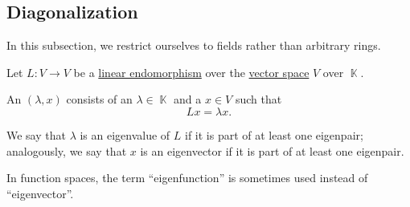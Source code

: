 \subsection{Diagonalization}\label{subsec:diagonalization}

In this subsection, we restrict ourselves to fields rather than arbitrary rings.

\begin{definition}\label{def:eigenpair}
  Let \( L: V \to V \) be a \hyperref[def:semimodule/homomorphism]{linear endomorphism} over the \hyperref[def:vector_space]{vector space} \( V \) over \( \BbbK \).

  An  \( (\lambda, x) \) consists of an  \( \lambda \in \BbbK \) and a   \( x \in V \) such that
  \begin{equation*}
    Lx = \lambda x.
  \end{equation*}

  We say that \( \lambda \) is an eigenvalue of \( L \) if it is part of at least one eigenpair; analogously, we say that \( x \) is an eigenvector if it is part of at least one eigenpair.

  In function spaces, the term \enquote{eigenfunction} is sometimes used instead of \enquote{eigenvector}.
\end{definition}

